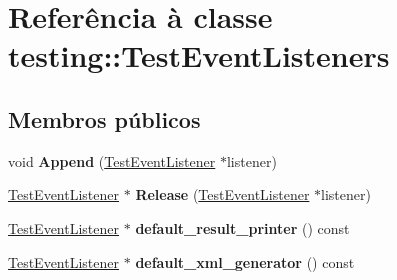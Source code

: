 \hypertarget{classtesting_1_1TestEventListeners}{\section{Referência à classe testing\-:\-:Test\-Event\-Listeners}
\label{classtesting_1_1TestEventListeners}
}
\subsection*{Membros públicos}
\begin{DoxyCompactItemize}
\item 
\hypertarget{classtesting_1_1TestEventListeners_a1207dce74d64c1c39ffa6105560536a0}{void {\bfseries Append} (\hyperlink{classtesting_1_1TestEventListener}{Test\-Event\-Listener} $\ast$listener)}\label{classtesting_1_1TestEventListeners_a1207dce74d64c1c39ffa6105560536a0}

\item 
\hypertarget{classtesting_1_1TestEventListeners_a038c9fa1975f84d6f3d25b52bc7bccdd}{\hyperlink{classtesting_1_1TestEventListener}{Test\-Event\-Listener} $\ast$ {\bfseries Release} (\hyperlink{classtesting_1_1TestEventListener}{Test\-Event\-Listener} $\ast$listener)}\label{classtesting_1_1TestEventListeners_a038c9fa1975f84d6f3d25b52bc7bccdd}

\item 
\hypertarget{classtesting_1_1TestEventListeners_a0a69b6a19e27d53d9ef4683c05e9f75a}{\hyperlink{classtesting_1_1TestEventListener}{Test\-Event\-Listener} $\ast$ {\bfseries default\-\_\-result\-\_\-printer} () const }\label{classtesting_1_1TestEventListeners_a0a69b6a19e27d53d9ef4683c05e9f75a}

\item 
\hypertarget{classtesting_1_1TestEventListeners_a9867c9af50e8d2934a2475286c7cebc5}{\hyperlink{classtesting_1_1TestEventListener}{Test\-Event\-Listener} $\ast$ {\bfseries default\-\_\-xml\-\_\-generator} () const }\label{classtesting_1_1TestEventListeners_a9867c9af50e8d2934a2475286c7cebc5}

\end{DoxyCompactItemize}
